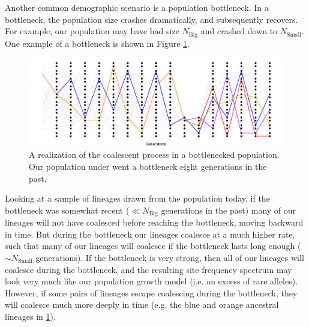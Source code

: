 Another common demographic scenario is a population bottleneck. In a bottleneck, the population size crashes dramatically, and subsequently
recovers. For example, our population may have had size $N_{\textrm{Big}}$
and crashed down to $N_{\textrm{Small}}$. One example of a
bottleneck is shown in Figure \ref{fig:Genealogy_crash}.
\begin{figure}
\begin{center}
  \includegraphics[width = \textwidth]{figures/Genetic_drift/Demography/Crash_genealogy.pdf}
\end{center}
\caption{A realization of the coalescent process in a bottlenecked population. Our population under went a bottleneck eight generations in the past.  } \label{fig:Genealogy_crash}
\end{figure}
Looking at a sample of lineages drawn from the population today, if
the bottleneck was somewhat recent ($\ll N_{\textrm{Big}}$ generations
in the past) many of our lineages will not have coalesced before reaching
the bottleneck, moving backward in time. But during the bottleneck our
lineages coalesce at a much higher rate, such that many of our
lineages will coalesce if the bottleneck lasts long enough
($\sim N_{\textrm{Small}}$ generations). If the bottleneck is very
strong, then all of our lineages will coalesce during the bottleneck, and the resulting site frequency spectrum may
look very much like our population growth model (i.e. an excess of rare
alleles). However, if some pairs of lineages escape coalescing during
the bottleneck, they will coalesce much more deeply in time (e.g. the
blue and orange ancestral lineages in
\ref{fig:Genealogy_crash}).
